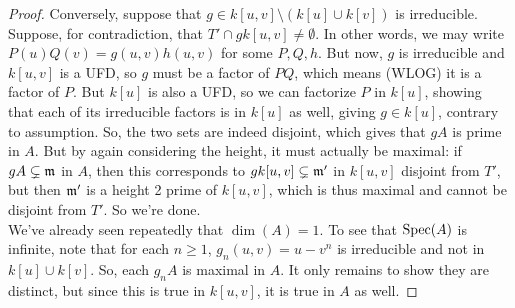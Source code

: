 \begin{proof}
	Conversely, suppose that $g \in k[u,v] \setminus (k[u] \cup k[v])$ is irreducible. Suppose, for contradiction, that $T' \cap gk[u,v] \neq \emptyset$. In other words, we may write $P(u)Q(v) = g(u,v)h(u,v)$ for some $P,Q,h$. But now, $g$ is irreducible and $k[u,v]$ is a UFD, so $g$ must be a factor of $PQ$, which means (WLOG) it is a factor of $P$. But $k[u]$ is also a UFD, so we can factorize $P$ in $k[u]$, showing that each of its irreducible factors is in $k[u]$ as well, giving $g \in k[u]$, contrary to assumption. So, the two sets are indeed disjoint, which gives that $gA$ is prime in $A$. But by again considering the height, it must actually be maximal: if $gA \subsetneq \mathfrak{m}$ in $A$, then this corresponds to $gk[u,v] \subsetneq \mathfrak{m}'$ in $k[u,v]$ disjoint from $T'$, but then $\mathfrak{m}'$ is a height 2 prime of $k[u,v]$, which is thus maximal and cannot be disjoint from $T'$. So we're done. \\
	
	We've already seen repeatedly that $\dim(A) = 1$. To see that $\operatorname{Spec}(A)$ is infinite, note that for each $n \geq 1$, $g_n(u,v) = u-v^n$ is irreducible and not in $k[u] \cup k[v]$. So, each $g_nA$ is maximal in $A$. It only remains to show they are distinct, but since this is true in $k[u,v]$, it is true in $A$ as well.
\end{proof}
